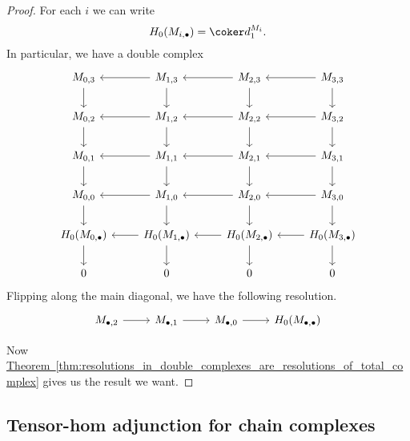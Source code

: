 \documentclass[main.tex]{subfiles}
\begin{document}
\begin{proof}
  For each $i$ we can write
  \begin{equation*}
    H_{0}(M_{i, \bullet}) = \coker d^{M_{i}}_{1}.
  \end{equation*}
  In particular, we have a double complex
  \begin{equation*}
    \begin{tikzcd}
      M_{0,3}
      \arrow[d]
      & M_{1,3}
      \arrow[d]
      \arrow[l]
      & M_{2,3}
      \arrow[d]
      \arrow[l]
      & M_{3,3}
      \arrow[d]
      \arrow[l]
      \\
      M_{0,2}
      \arrow[d]
      & M_{1,2}
      \arrow[d]
      \arrow[l]
      & M_{2,2}
      \arrow[d]
      \arrow[l]
      & M_{3,2}
      \arrow[d]
      \arrow[l]
      \\
      M_{0,1}
      \arrow[d]
      & M_{1,1}
      \arrow[d]
      \arrow[l]
      & M_{2,1}
      \arrow[d]
      \arrow[l]
      & M_{3,1}
      \arrow[d]
      \arrow[l]
      \\
      M_{0,0}
      \arrow[d]
      & M_{1,0}
      \arrow[l]
      \arrow[d]
      & M_{2,0}
      \arrow[l]
      \arrow[d]
      & M_{3,0}
      \arrow[l]
      \arrow[d]
      \\
      H_{0}(M_{0,\bullet})
      \arrow[d]
      & H_{0}(M_{1,\bullet})
      \arrow[d]
      \arrow[l]
      & H_{0}(M_{2,\bullet})
      \arrow[d]
      \arrow[l]
      & H_{0}(M_{3,\bullet})
      \arrow[l]
      \arrow[d]
      \\
      0
      & 0
      & 0
      & 0
    \end{tikzcd}
  \end{equation*}
  Flipping along the main diagonal, we have the following resolution.
  \begin{equation*}
    \begin{tikzcd}
      M_{\bullet, 2}
      \arrow[r]
      & M_{\bullet, 1}
      \arrow[r]
      & M_{\bullet, 0}
      \arrow[r]
      & H_{0}(M_{\bullet, \bullet})
    \end{tikzcd}
  \end{equation*}

  Now \hyperref[thm:resolutions_in_double_complexes_are_resolutions_of_total_complex]{Theorem~\ref*{thm:resolutions_in_double_complexes_are_resolutions_of_total_complex}} gives us the result we want.
\end{proof}

\subsection{Tensor-hom adjunction for chain complexes}
\label{ssc:tensor_hom_adjunction_for_chain_complexes}
\end{document}
